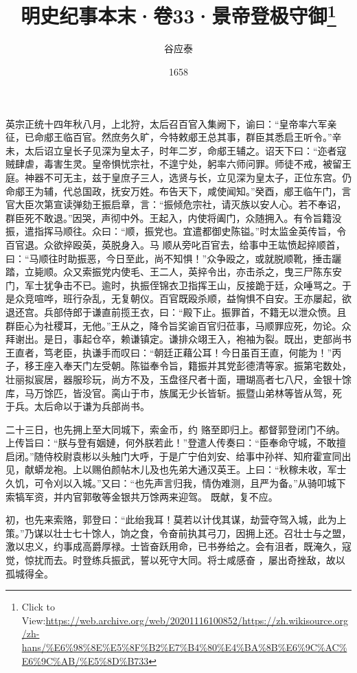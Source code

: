 \documentclass{article}
\title{明史纪事本末·卷33·景帝登极守御\footnote{Click to View:\url{https://web.archive.org/web/20201116100852/https://zh.wikisource.org/zh-hans/%E6%98%8E%E5%8F%B2%E7%B4%80%E4%BA%8B%E6%9C%AC%E6%9C%AB/%E5%8D%B733}}}
\author{谷应泰}
\date{1658}
\begin{document}

\maketitle


\Large

﻿英宗正统十四年秋八月，上北狩，太后召百官入集阙下，谕曰：“皇帝率六军亲征，已命郕王临百官。然庶务久旷，今特敕郕王总其事，群臣其悉启王听令。”辛未，太后诏立皇长子见深为皇太子，时年二岁，命郕王辅之。诏天下曰：“迩者寇贼肆虐，毒害生灵。皇帝惧忧宗社，不遑宁处，躬率六师问罪。师徒不戒，被留王庭。神器不可无主，兹于皇庶子三人，选贤与长，立见深为皇太子，正位东宫。仍命郕王为辅，代总国政，抚安万姓。布告天下，咸使闻知。”癸酉，郕王临午门，言官大臣次第宣读弹劾王振启章，言：“振倾危宗社，请灭族以安人心。若不奉诏，群臣死不敢退。”因哭，声彻中外。王起入，内使将阖门，众随拥入。有令旨籍没振，遣指挥马顺往。众曰：“顺，振党也。宜遣都御史陈镒。”时太监金英传旨，令百官退。众欲捽殴英，英脱身入。马
\newpage
顺从旁叱百官去，给事中王竑愤起捽顺首，曰：“马顺往时助振恶，今日至此，尚不知惧！”众争殴之，或就脱顺靴，捶击躧踏，立毙顺。众又索振党内使毛、王二人，英捽令出，亦击杀之，曳三尸陈东安门，军士犹争击不已。逾时，执振侄锦衣卫指挥王山，反接跪于廷，众唾骂之。于是众竞喧哗，班行杂乱，无复朝仪。百官既殴杀顺，益恟惧不自安。王亦屡起，欲退还宫。兵部侍郎于谦直前揽王衣，曰：“殿下止。振罪首，不籍无以泄众愤。且群臣心为社稷耳，无他。”王从之，降令旨奖谕百官归莅事，马顺罪应死，勿论。众拜谢出。是日，事起仓卒，赖谦镇定。谦排众翊王入，袍袖为裂。既出，吏部尚书王直者，笃老臣，执谦手而叹曰：“朝廷正藉公耳！今日虽百王直，何能为！”丙子，移王座入奉天门左受朝。陈镒奉令旨，籍振并其党彭德清等家。振第宅数处，壮丽拟宸居，器服珍玩，尚方不及，玉盘径尺者十面，珊瑚高者七八尺，金银十馀库，马万馀匹，皆没官。脔山于市，族属无少长皆斩。振暨山弟林等皆从驾，死
于兵。太后命以于谦为兵部尚书。 

二十三日，也先拥上至大同城下，索金币，约
\newpage
赂至即归上。都督郭登闭门不纳。上传旨曰：“朕与登有姻㜕，何外朕若此！”登遣人传奏曰：“臣奉命守城，不敢擅启闭。”随侍校尉袁彬以头触门大呼，于是广宁伯刘安、给事中孙祥、知府霍宣同出见，献蟒龙袍。上以赐伯颜帖木儿及也先弟大通汉英王。上曰：“秋稼未收，军士久饥，可令刈以入城。”又曰：“也先声言归我，情伪难测，且严为备。”从骑叩城下索犒军资，并内官郭敬等金银共万馀两来迎驾。
既献，复不应。 

初，也先来索赂，郭登曰：“此绐我耳！莫若以计伐其谋，劫营夺驾入城，此为上策。”乃谋以壮士七十馀人，饷之食，令奋前执其弓刀，因拥上还。召壮士与之盟，激以忠义，约事成高爵厚禄。士皆奋跃用命，已书券给之。会有沮者，既淹久，寇觉，惊扰而去。时登练兵振武，誓以死守大同。将士咸感奋
，屡出奇挫敌，故以孤城得全。 
\end{document}
